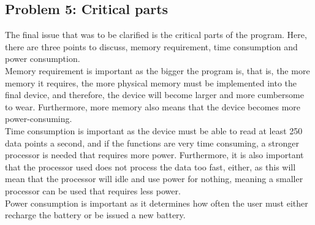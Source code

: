 \documentclass[12pt,a4paper]{article}
\begin{document}
\subsection{Problem 5: Critical parts}
	The final issue that was to be clarified is the critical parts of the program. Here, there are three points to discuss, memory requirement, time consumption and power consumption.\\
	Memory requirement is important as the bigger the program is, that is, the more memory it requires, the more physical memory must be implemented into the final device, and therefore, the device will become larger and more cumbersome to wear. Furthermore, more memory also means that the device becomes more power-consuming.\\
	Time consumption is important as the device must be able to read at least 250 data points a second, and if the functions are very time consuming, a stronger processor is needed that requires more power. Furthermore, it is also important that the processor used does not process the data too fast, either, as this will mean that the processor will idle and use power for nothing, meaning a smaller processor can be used that requires less power.\\
	Power consumption is important as it determines how often the user must either recharge the battery or be issued a new battery.\\
	
\end{document}

